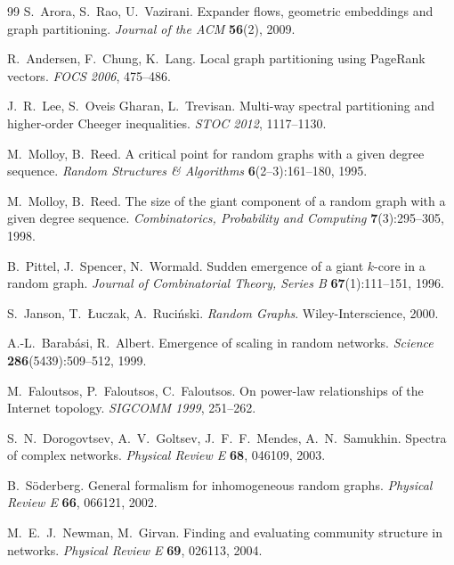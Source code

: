 \documentclass[11pt,a4paper]{article}
\theoremstyle{plain}
\theoremstyle{definition}
\theoremstyle{remark}
\begin{document}
\begin{thebibliography}{99}
S.~Arora, S.~Rao, U.~Vazirani.
\newblock Expander flows, geometric embeddings and graph partitioning.
\newblock \emph{Journal of the ACM} \textbf{56}(2), 2009.

R.~Andersen, F.~Chung, K.~Lang.
\newblock Local graph partitioning using PageRank vectors.
\newblock \emph{FOCS 2006}, 475--486.

J.~R.~Lee, S.~Oveis Gharan, L.~Trevisan.
\newblock Multi-way spectral partitioning and higher-order Cheeger inequalities.
\newblock \emph{STOC 2012}, 1117--1130.

M.~Molloy, B.~Reed.
\newblock A critical point for random graphs with a given degree sequence.
\newblock \emph{Random Structures \& Algorithms} \textbf{6}(2--3):161--180, 1995.

M.~Molloy, B.~Reed.
\newblock The size of the giant component of a random graph with a given degree
sequence.
\newblock \emph{Combinatorics, Probability and Computing} \textbf{7}(3):295--305, 1998.

B.~Pittel, J.~Spencer, N.~Wormald.
\newblock Sudden emergence of a giant $k$-core in a random graph.
\newblock \emph{Journal of Combinatorial Theory, Series B} \textbf{67}(1):111--151, 1996.

S.~Janson, T.~{\L}uczak, A.~Ruci\'nski.
\newblock \emph{Random Graphs}.
\newblock Wiley-Interscience, 2000.

A.-L.~Barab\'asi, R.~Albert.
\newblock Emergence of scaling in random networks.
\newblock \emph{Science} \textbf{286}(5439):509--512, 1999.

M.~Faloutsos, P.~Faloutsos, C.~Faloutsos.
\newblock On power-law relationships of the Internet topology.
\newblock \emph{SIGCOMM 1999}, 251--262.

S.~N.~Dorogovtsev, A.~V.~Goltsev, J.~F.~F.~Mendes, A.~N.~Samukhin.
\newblock Spectra of complex networks.
\newblock \emph{Physical Review E} \textbf{68}, 046109, 2003.

B.~S\"oderberg.
\newblock General formalism for inhomogeneous random graphs.
\newblock \emph{Physical Review E} \textbf{66}, 066121, 2002.

M.~E.~J.~Newman, M.~Girvan.
\newblock Finding and evaluating community structure in networks.
\newblock \emph{Physical Review E} \textbf{69}, 026113, 2004.


\end{thebibliography}
\end{document}
